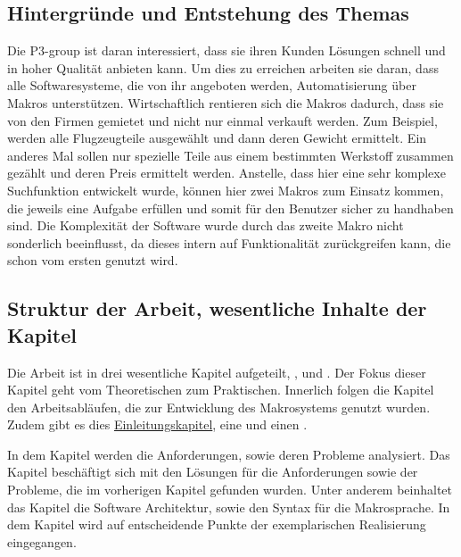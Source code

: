   \subsection{Hintergründe und Entstehung des Themas}
  \label{ssec:Hintergründe und Entstehung des Themas}
    Die P3-group ist daran interessiert, dass sie ihren Kunden Lösungen schnell und in hoher Qualität anbieten kann. Um dies zu erreichen arbeiten sie daran, dass alle Softwaresysteme, die von ihr angeboten werden, Automatisierung über Makros unterstützen. Wirtschaftlich rentieren sich die Makros dadurch, dass sie von den Firmen gemietet und nicht nur einmal verkauft werden. Zum Beispiel, werden alle Flugzeugteile ausgewählt und dann deren Gewicht ermittelt. Ein anderes Mal sollen nur spezielle Teile aus einem bestimmten Werkstoff zusammen gezählt und deren Preis ermittelt werden. Anstelle, dass hier eine sehr komplexe Suchfunktion entwickelt wurde, können hier zwei Makros zum Einsatz kommen, die jeweils eine Aufgabe erfüllen und somit für den Benutzer sicher zu handhaben sind. Die Komplexität der Software wurde durch das zweite Makro nicht sonderlich beeinflusst, da dieses intern auf Funktionalität zurückgreifen kann, die schon vom ersten genutzt wird.

  \subsection{Struktur der Arbeit, wesentliche Inhalte der Kapitel}
  \label{ssec:Struktur der Arbeit, wesentliche Inhalte der Kapitel}
    Die Arbeit ist in drei wesentliche Kapitel aufgeteilt, ,  und . Der Fokus dieser Kapitel geht vom Theoretischen zum Praktischen. Innerlich folgen die Kapitel den Arbeitsabläufen, die zur Entwicklung des Makrosystems genutzt wurden. Zudem gibt es dies \hyperref[sec:Einleitung]{Einleitungskapitel}, eine  und einen .

    In dem Kapitel  werden die Anforderungen, sowie deren Probleme analysiert. Das Kapitel  beschäftigt sich mit den Lösungen für die Anforderungen sowie der Probleme, die im vorherigen Kapitel gefunden wurden. Unter anderem beinhaltet das Kapitel die Software Architektur, sowie den Syntax für die Makrosprache. In dem Kapitel  wird auf entscheidende Punkte der exemplarischen Realisierung eingegangen.

